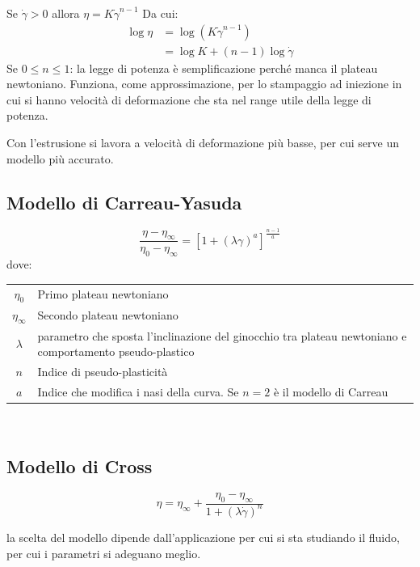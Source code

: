 Se $\dot{\gamma} > 0$ allora $\eta = K \dot{\gamma}^{n-1}$
Da cui:
\begin{equation}
\begin{split}
\log \eta &= \log\left( K \dot{\gamma}^{n-1}\right)\\
&= \log K + (n-1)\log \dot{\gamma}
\end{split}
\end{equation}
Se $0\leq n \leq 1$: la legge di potenza è semplificazione perché manca il plateau newtoniano. Funziona, come approssimazione, per lo stampaggio ad iniezione in cui si hanno velocità di deformazione che sta nel range utile della legge di potenza.

Con l'estrusione si lavora a velocità di deformazione più basse, per cui serve un modello più accurato.

\subsection{Modello di Carreau-Yasuda}
\begin{equation}
\frac{\eta - \eta_{\infty}}{\eta_0 - \eta_{\infty}} = \left[1 + (\lambda \gamma)^a\right]^{\frac{n-1}{a}}
\label{eqn:CarreauYasuda}
\end{equation}
dove:\\
\begin{tabular}{cp{}}
$\eta_0$ & Primo plateau newtoniano\\
$\eta_{\infty}$ & Secondo plateau newtoniano\\
$\lambda$ & parametro che sposta l'inclinazione del ginocchio tra plateau newtoniano e comportamento pseudo-plastico\\
$n$ & Indice di pseudo-plasticità\\
$a$ & Indice che modifica i nasi della curva. Se $n=2$ è il modello di Carreau
\end{tabular}\\

\subsection{Modello di Cross}
\begin{equation}
\eta = \eta_{\infty} + \frac{\eta_0 - \eta_{\infty}}{1+(\lambda \dot{\gamma})^n}
\end{equation}

la scelta del modello dipende dall'applicazione per cui si sta studiando il fluido, per cui i parametri si adeguano meglio.


